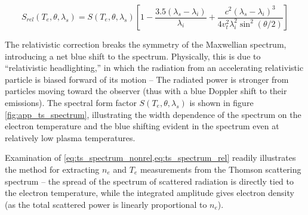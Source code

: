 \begin{equation}\label{eq:ts_spectrum_rel}
 S_{rel}(T_e,\theta,\lambda_s) = S(T_e,\theta,\lambda_s) \left[ 1 - \frac{3.5(\lambda_s - \lambda_i)}{\lambda_i} + \frac{c^2 (\lambda_s - \lambda_i)^3}{4v_t^2 \lambda_i^2 \sin^2 (\theta/2)}\right]
\end{equation}

\noindent The relativistic correction breaks the symmetry of the Maxwellian spectrum, introducing a net blue shift to the spectrum.  Physically, this is due to ``relativistic headlighting,'' in which the radiation from an accelerating relativistic particle is biased forward of its motion -- The radiated power is stronger from particles moving toward the observer (thus with a blue Doppler shift to their emissions).  The spectral form factor $S(T_e,\theta,\lambda_s)$ is shown in figure \cref{fig:app_ts_spectrum}, illustrating the width dependence of the spectrum on the electron temperature and the blue shifting evident in the spectrum even at relatively low plasma temperatures.

\begin{figure}[t]
 \pushtooutside
\end{figure}

Examination of \cref{eq:ts_spectrum_nonrel,eq:ts_spectrum_rel} readily illustrates the method for extracting $n_e$ and $T_e$ measurements from the Thomson scattering spectrum -- the spread of the spectrum of scattered radiation is directly tied to the electron temperature, while the integrated amplitude gives electron density (as the total scattered power is linearly proportional to $n_e$).

